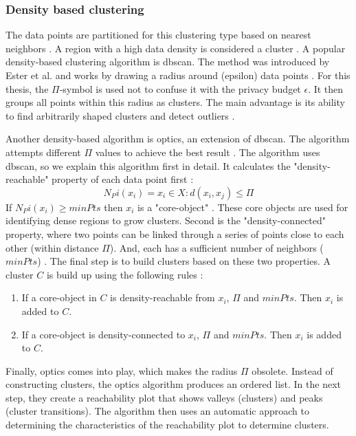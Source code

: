 
\subsubsection{Density based clustering}
The data points are partitioned for this clustering type based on nearest neighbors \citep{fahad_survey_2014}.
A region with a high data density is considered a cluster \citep{xu_comprehensive_2015}.
A popular density-based clustering algorithm is \gls{dbscan}.
The method was introduced by Ester et al. and works by drawing a radius around (epsilon) data points \citep{ester_density-based_nodate}.
For this thesis, the $\Pi$-symbol is used not to confuse it with the privacy budget $\epsilon$.
It then groups all points within this radius as clusters.
The main advantage is its ability to find arbitrarily shaped clusters and detect outliers \citep{liu_privacy_2012}.

Another density-based algorithm is \gls{optics}, an extension of \gls{dbscan}.
The algorithm attempts different $\Pi$ values to achieve the best result \citep{ankerst_optics_nodate}.
The algorithm uses \gls{dbscan}, so we explain this algorithm first in detail.
It calculates the "density-reachable" property of each data point first \citep{ankerst_optics_nodate}:
\begin{equation}
  N_Pi(x_i) = {x_i \in X : d(x_i, x_j) \leq \Pi}
\end{equation}
If $N_Pi(x_i) \geq minPts$ then $x_i$ is a "core-object" \citep{ankerst_optics_nodate}.
These core objects are used for identifying dense regions to grow clusters.
Second is the "density-connected" property, where two points can be linked through a series of points close to each other (within distance $\Pi$).
And, each has a sufficient number of neighbors ($minPts$) \citep{ankerst_optics_nodate}.
The final step is to build clusters based on these two properties.
A cluster $C$ is build up using the following rules \citep{ankerst_optics_nodate}:
\begin{enumerate}
  \item If a core-object in $C$ is density-reachable from $x_i$, $\Pi$ and $minPts$. Then $x_i$ is added to $C$.
  \item If a core-object is density-connected to $x_i$, $\Pi$ and $minPts$. Then $x_i$ is added to $C$.
\end{enumerate}
Finally, \gls{optics} comes into play, which makes the radius $\Pi$ obsolete.
Instead of constructing clusters, the \gls{optics} algorithm produces an ordered list.
In the next step, they create a reachability plot that shows valleys (clusters) and peaks (cluster transitions).
The algorithm then uses an automatic approach to determining the characteristics of the reachability plot to determine clusters.

